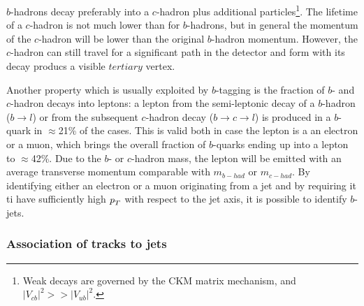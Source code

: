 \begin{itemize}
$b$-hadrons decay preferably into a $c$-hadron plus additional particles\footnote{Weak decays are governed by the CKM matrix mechanism, and $|V_{cb}|^2 >> |V_{ub}|^2$.}. The lifetime of a $c$-hadron is not much lower than for $b$-hadrons, but in general the momentum of the $c$-hadron will be lower than the original $b$-hadron momentum. However, the $c$-hadron can still travel for a significant path in the detector and form with its decay producs a visible $tertiary$ vertex. 

Another property which is usually exploited by $b$-tagging is the fraction of $b$- and $c$-hadron decays into leptons: a lepton from the semi-leptonic decay of a $b$-hadron ($b \rightarrow l$) or from the subsequent $c$-hadron decay ($b \rightarrow c \rightarrow l$) is produced in a $b$-quark in $\approx$21\% of the cases. This is valid both in case the lepton is a an electron or a muon, which brings the overall fraction of $b$-quarks ending up into a lepton to $\approx$42\%. Due to the $b$- or $c$-hadron mass, the lepton will be emitted with an average transverse momentum comparable with $m_{b-had}$ or $m_{c-had}$. By identifying either an electron or a muon originating from a jet and by requiring it ti have sufficiently high ${\emph{p}_{T}}$ with respect to the jet axis, it is possible to identify $b$-jets.



\subsubsection{Association of tracks to jets}


\end{itemize}
